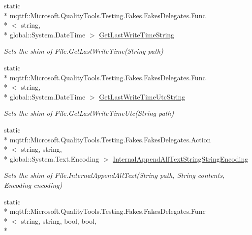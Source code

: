 \begin{DoxyCompactItemize}
static \\*
mqttf\-::\-Microsoft.\-Quality\-Tools.\-Testing.\-Fakes.\-Fakes\-Delegates.\-Func\\*
$<$ string, \\*
global\-::\-System.\-Date\-Time $>$ \hyperlink{class_system_1_1_i_o_1_1_fakes_1_1_shim_file_a7df3ab6275712b1ae977a1ade28de4db}{Get\-Last\-Write\-Time\-String}
\begin{DoxyCompactList}\small\item\em Sets the shim of File.\-Get\-Last\-Write\-Time(\-String path)\end{DoxyCompactList}\item 
static \\*
mqttf\-::\-Microsoft.\-Quality\-Tools.\-Testing.\-Fakes.\-Fakes\-Delegates.\-Func\\*
$<$ string, \\*
global\-::\-System.\-Date\-Time $>$ \hyperlink{class_system_1_1_i_o_1_1_fakes_1_1_shim_file_a80b4e26ca996a276673aa7e22c16c58b}{Get\-Last\-Write\-Time\-Utc\-String}
\begin{DoxyCompactList}\small\item\em Sets the shim of File.\-Get\-Last\-Write\-Time\-Utc(\-String path)\end{DoxyCompactList}\item 
static \\*
mqttf\-::\-Microsoft.\-Quality\-Tools.\-Testing.\-Fakes.\-Fakes\-Delegates.\-Action\\*
$<$ string, string, \\*
global\-::\-System.\-Text.\-Encoding $>$ \hyperlink{class_system_1_1_i_o_1_1_fakes_1_1_shim_file_a38dd38155913c6ae63b2412dab1bfaa1}{Internal\-Append\-All\-Text\-String\-String\-Encoding}
\begin{DoxyCompactList}\small\item\em Sets the shim of File.\-Internal\-Append\-All\-Text(\-String path, String contents, Encoding encoding)\end{DoxyCompactList}\item 
static \\*
mqttf\-::\-Microsoft.\-Quality\-Tools.\-Testing.\-Fakes.\-Fakes\-Delegates.\-Func\\*
$<$ string, string, bool, bool, \\*

\end{DoxyCompactItemize}
